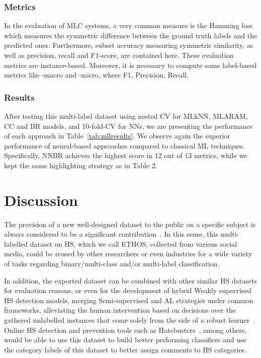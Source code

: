 \documentclass[sigconf]{acmart}
\begin{document}
\subsubsection{Metrics}
In the evaluation of MLC systems, a very common measure is the Hamming loss which measures the symmetric difference between the ground truth labels and the predicted ones. Furthermore, subset accuracy measuring symmetric similarity, as well as precision, recall and F1-score, are contained here. These evaluation metrics are instance-based. Moreover, it is necessary to compute some label-based metrics like -macro and -micro, where F1, Precision, Recall.

\subsubsection{Results}
After testing this multi-label dataset using nested CV for MLkNN, MLARAM, CC and BR models, and 10-fold-CV for NNs, we are presenting the performance of each approach in Table~\ref{tab:mllresults}. We observe again the superior performance of neural-based approaches compared to classical ML techniques. Specifically, NNBR achieves the highest score in 12 out of 13 metrics, while we kept the same highlighting strategy as in Table 2.

\section{Discussion}

The provision of a new well-designed dataset to the public on a specific subject is always considered to be a significant contribution~\cite{DBLP:conf/cikm/SunAJHS19, DBLP:conf/cikm/HoangVN18}. In this sense, this multi-labelled dataset on HS, which we call ETHOS, collected from various social media, could be reused by other researchers or even industries for a wide variety of tasks regarding binary/multi-class and/or multi-label classification. 

In addition, the exported dataset can be combined with other similar HS datasets for evaluation reasons, or even for the development of hybrid Weakly supervised HS detection models, merging Semi-supervised and AL strategies under common frameworks, alleviating the human intervention based on decisions over the gathered unlabelled instances that come solely from the side of a robust learner~\cite{DBLP:journals/mlc/YuFXQ19, DBLP:conf/iisa/KarlosKAFK19}. Online HS detection and prevention tools such as Hatebusters~\cite{hatebusters}, among others, would be able to use this dataset to build better performing classifiers and use the category labels of this dataset to better assign comments to HS categories.
\end{document}
